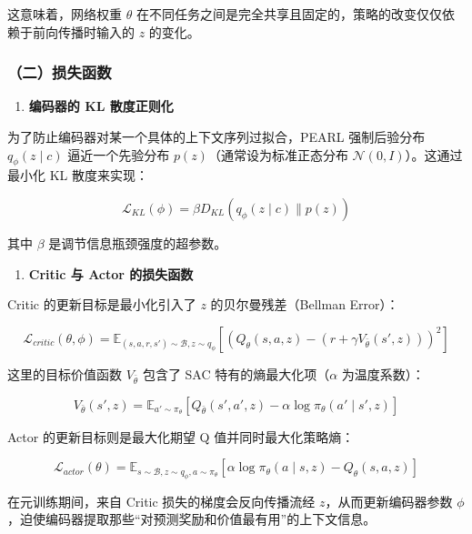 这意味着，网络权重 \(\theta\) 在不同任务之间是完全共享且固定的，策略的改变仅仅依赖于前向传播时输入的 \(z\) 的变化。

\hypertarget{ux4e8cux635fux5931ux51fdux6570}{%
\subsubsection{（二）损失函数}\label{ux4e8cux635fux5931ux51fdux6570}}

\begin{enumerate}
\def\labelenumi{\arabic{enumi}.}
\tightlist
\item
  \textbf{编码器的 KL 散度正则化}
\end{enumerate}

为了防止编码器对某一个具体的上下文序列过拟合，PEARL 强制后验分布 \(q_{\phi}(z\mid c)\) 逼近一个先验分布 \(p(z)\)（通常设为标准正态分布 \(\mathcal{N}(0,I)\)）。这通过最小化 KL 散度来实现：

\[
\mathcal{L}_{KL}(\phi)=\beta D_{KL}(q_{\phi}(z\mid c)\|p(z))
\]

其中 \(\beta\) 是调节信息瓶颈强度的超参数。

\begin{enumerate}
\def\labelenumi{\arabic{enumi}.}
\setcounter{enumi}{1}
\tightlist
\item
  \textbf{Critic 与 Actor 的损失函数}
\end{enumerate}

Critic 的更新目标是最小化引入了 \(z\) 的贝尔曼残差（Bellman Error）：

\[
\mathcal{L}_{critic}(\theta,\phi)=
\mathbb{E}_{(s,a,r,s')\sim\mathcal{B},z\sim q_{\phi}}
\left[
\left(
Q_{\theta}(s,a,z)-
(r+\gamma V_{\bar{\theta}}(s',z))
\right)^2
\right]
\]

这里的目标价值函数 \(V_{\bar{\theta}}\) 包含了 SAC 特有的熵最大化项（\(\alpha\) 为温度系数）：

\[
V_{\bar{\theta}}(s',z)=
\mathbb{E}_{a'\sim\pi_{\theta}}
\left[
Q_{\bar{\theta}}(s',a',z)-
\alpha\log\pi_{\theta}(a'\mid s',z)
\right]
\]

Actor 的更新目标则是最大化期望 Q 值并同时最大化策略熵：

\[
\mathcal{L}_{actor}(\theta)=
\mathbb{E}_{s\sim\mathcal{B},z\sim q_{\phi},a\sim\pi_{\theta}}
\left[
\alpha\log\pi_{\theta}(a\mid s,z)-
Q_{\theta}(s,a,z)
\right]
\]

在元训练期间，来自 Critic 损失的梯度会反向传播流经 \(z\)，从而更新编码器参数 \(\phi\)，迫使编码器提取那些``对预测奖励和价值最有用''的上下文信息。

